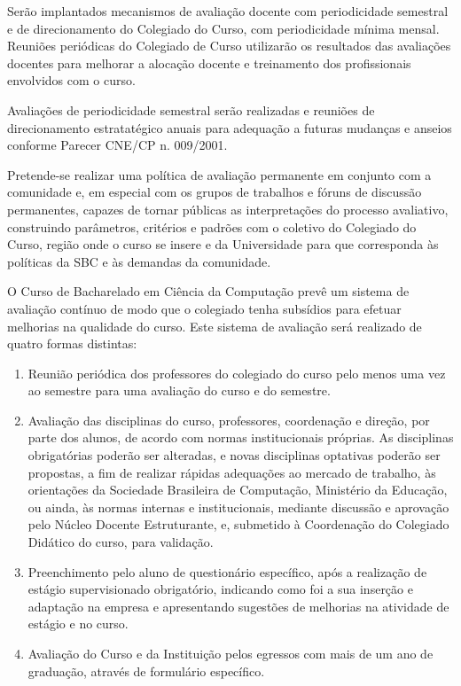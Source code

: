\documentclass[
	12pt,				%
	openright,			%
  oneside,     %
	a4paper,			%
	english,			%
	french,				%
	spanish,			%
	brazil				%
	]{abntex2}
\begin{document}
Serão implantados mecanismos de avaliação docente com periodicidade semestral e de direcionamento do Colegiado do Curso, com periodicidade mínima mensal. Reuniões periódicas do Colegiado de Curso utilizarão os resultados das avaliações docentes para melhorar a alocação docente e treinamento dos profissionais envolvidos com o curso.

Avaliações de periodicidade semestral serão realizadas e reuniões de direcionamento estratatégico anuais para adequação a futuras mudanças e anseios conforme Parecer CNE/CP n. 009/2001.

Pretende-se realizar uma política de avaliação permanente em conjunto com a comunidade e, em especial com os grupos de trabalhos e fóruns de discussão permanentes, capazes de tornar públicas as interpretações do processo avaliativo, construindo parâmetros, critérios e padrões com o coletivo do Colegiado do Curso, região onde o curso se insere e da Universidade para que corresponda às políticas da SBC e às demandas da comunidade.

O Curso de Bacharelado em Ciência da Computação  prevê um sistema de avaliação contínuo de modo que o colegiado tenha subsídios para  efetuar melhorias na qualidade do curso. Este sistema de avaliação será realizado de quatro formas distintas:

\begin{enumerate}
\item Reunião periódica dos professores do colegiado do curso pelo menos uma vez ao semestre para uma avaliação do curso e do semestre.
\item Avaliação das disciplinas do curso, professores, coordenação e direção, por parte dos alunos, de acordo com normas institucionais próprias. As disciplinas obrigatórias poderão ser alteradas, e novas disciplinas optativas poderão ser propostas, a fim de realizar rápidas adequações ao mercado de trabalho, às orientações da Sociedade Brasileira de Computação, Ministério da Educação, ou ainda, às normas internas e institucionais, mediante discussão e aprovação pelo Núcleo Docente Estruturante, e, submetido à Coordenação do Colegiado Didático do curso, para validação.
\item Preenchimento pelo aluno de questionário específico, após a realização de estágio supervisionado obrigatório, indicando como foi a sua inserção e adaptação na empresa e apresentando sugestões de melhorias na atividade de estágio e no curso.
\item Avaliação do Curso e da Instituição pelos egressos com mais de um ano de graduação, através de formulário específico.
\end{enumerate}
\end{document}
